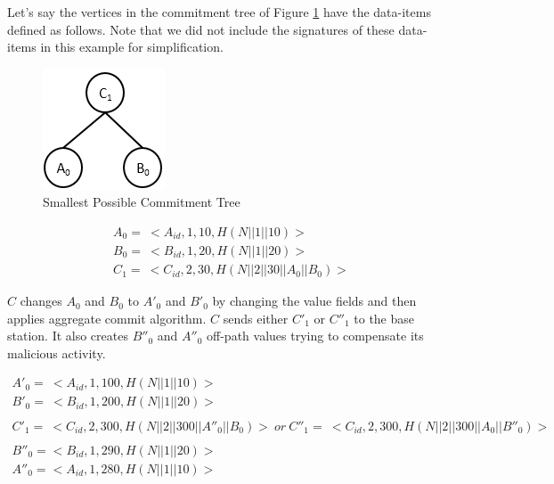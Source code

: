 		\begin{exmp}
			\label{ex1:malicious-activity}
			Let's say the vertices in the commitment tree of Figure \ref{fig:malicious-activity} have the data-items defined as follows.
			Note that we did not include the signatures of these data-items in this example for simplification.

			\begin{figure}[t]
				\centering
				\includegraphics{images/commitment-tree-2.png}
				\caption{Smallest Possible Commitment Tree}
				\label{fig:malicious-activity}
			\end{figure}

			\begin{equation*}
				\begin{array}{l}
					A_{0} =\ <A_{id},1,10, H(N||1||10)>\\
					B_{0} =\ <B_{id},1,20, H(N||1||20)>\\
					C_{1} =\ <C_{id},2,30, H(N||2||30||A_{0}||B_{0})>
				\end{array}
			\end{equation*}

			$C$ changes $A_{0}$ and $B_{0}$ to $A'_{0}$ and $B'_{0}$ by changing the value fields and then applies aggregate commit algorithm.
			$C$ sends either $C'_{1}$ or $C''_{1}$ to the base station.
			It also creates $B''_{0}$ and $A''_{0}$ off-path values trying to compensate its malicious activity.

			\begin{equation*}
				\begin{array}{l}
					A'_{0} =\ <A_{id},1,100, H(N||1||10)>\\
					B'_{0} =\ <B_{id},1,200, H(N||1||20)>\\
					\\
					C'_{1} =\ <C_{id},2,300, H(N||2||300||A''_{0}||B_{0})>\ or\ C''_{1} =\ <C_{id},2,300, H(N||2||300||A_{0}||B''_{0})>\\
					\\
					B''_{0} = <B_{id},1,290,H(N||1||20)>\\
					A''_{0} = <A_{id},1,280,H(N||1||10)>
				\end{array}
			\end{equation*}


\end{exmp}
